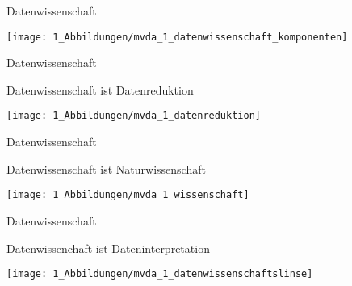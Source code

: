 \documentclass[
  8pt,
  ignorenonframetext,
]{beamer}
\begin{document}
\begin{frame}{Datenwissenschaft}
\protect\hypertarget{datenwissenschaft-1}{}
\vspace{2mm}

\begin{center}\texttt{[image: 1\_Abbildungen/mvda\_1\_datenwissenschaft\_komponenten]} \end{center}
\vfill
\end{frame}

\begin{frame}{Datenwissenschaft}
\protect\hypertarget{datenwissenschaft-2}{}
\Large

Datenwissenschaft ist Datenreduktion

\center
\vspace{.4cm}

\begin{center}\texttt{[image: 1\_Abbildungen/mvda\_1\_datenreduktion]} \end{center}
\end{frame}

\begin{frame}{Datenwissenschaft}
\protect\hypertarget{datenwissenschaft-3}{}
\Large

Datenwissenschaft ist Naturwissenschaft \vspace{3mm}

\begin{center}\texttt{[image: 1\_Abbildungen/mvda\_1\_wissenschaft]} \end{center}
\end{frame}

\begin{frame}{Datenwissenschaft}
\protect\hypertarget{datenwissenschaft-4}{}
\Large

Datenwissenchaft ist Dateninterpretation \center \vspace{.5cm}

\begin{center}\texttt{[image: 1\_Abbildungen/mvda\_1\_datenwissenschaftslinse]} \end{center}
\end{frame}
\end{document}
